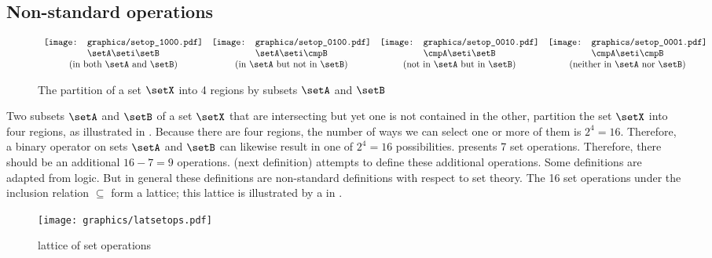 \subsection{Non-standard operations}
\begin{figure}
  \centering
$\begin{array}{cccc}
    \texttt{[image: graphics/setop\_1000.pdf]}
   &\texttt{[image: graphics/setop\_0100.pdf]}
   &\texttt{[image: graphics/setop\_0010.pdf]}
   &\texttt{[image: graphics/setop\_0001.pdf]}
  \\\setA\seti\setB
   &\setA\seti\cmpB
   &\cmpA\seti\setB
   &\cmpA\seti\cmpB
  \\\text{(in both $\setA$ and $\setB$)}
   &\text{(in $\setA$ but not in $\setB$)}
   &\text{(not in $\setA$ but in $\setB$)}
   &\text{(neither in $\setA$ nor $\setB$)}
\end{array}$
\caption{
  The partition of a set $\setX$ into 4 regions by subsets $\setA$ and $\setB$
  \label{fig:AB4}
  }
\end{figure}
%  
Two subsets $\setA$ and $\setB$ of a set $\setX$ that are intersecting but
yet one is not contained in the other,
partition the set $\setX$ into four regions, as illustrated in .
Because there are four regions, the number of ways we can select one or more of them
is $2^4=16$.
Therefore, a binary operator on sets $\setA$ and $\setB$ can likewise result in one of
$2^4=16$ possibilities.
 presents 7 set operations.
Therefore, there should be an additional $16-7=9$ operations.
 (next definition) attempts to define these additional operations.
Some definitions are adapted from logic.
But in general these definitions are non-standard definitions with respect to set theory.
The 16 set operations under the inclusion relation $\subseteq$ form a lattice;
this lattice is illustrated by a  in .
\begin{figure}
  \centering
  \texttt{[image: graphics/latsetops.pdf]}
  \caption{lattice of set operations\label{fig:setops16}}
\end{figure}


